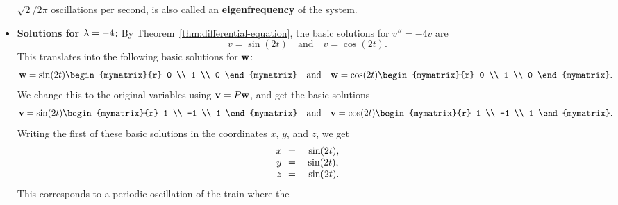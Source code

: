 \begin{solution}
\begin{itemize}
    $\sqrt{2}/2\pi$ oscillations per second, is also called an
    \textbf{eigenfrequency}%
     of the system.
  \item \textbf{Solutions for $\lambda=-4$:}
    By Theorem~\ref{thm:differential-equation}, the basic solutions
    for $v'' = -4v$ are
    \begin{equation*}
      v=\sin(2t)
      \quad\mbox{and}\quad
      v=\cos(2t).
    \end{equation*}
    This translates into the following basic solutions for $\mbox{\bf w}$:
    \begin{equation*}
      \vect{w}
      = \sin(2t)\begin{mymatrix}{r} 0 \\ 1 \\ 0 \end{mymatrix}
      \quad\mbox{and}\quad
      \vect{w}
      = \cos(2t)\begin{mymatrix}{r} 0 \\ 1 \\ 0 \end{mymatrix}.
    \end{equation*}
    We change this to the original variables using $\mbox{\bf v} =
    P\mbox{\bf w}$, and get the basic solutions
    \begin{equation*}
      \vect{v} 
      = \sin(2t)\begin{mymatrix}{r} 1 \\ -1 \\ 1 \end{mymatrix}
      \quad\mbox{and}\quad
      \vect{v}
      = \cos(2t)\begin{mymatrix}{r} 1 \\ -1 \\ 1 \end{mymatrix}.
    \end{equation*}
    Writing the first of these basic solutions in the coordinates $x$,
    $y$, and $z$, we get
    \begin{equation*}
      \begin{array}{c@{~~}c@{~}l}
        x &=& ~~~\sin(2t), \\
        y &=& -\sin(2t), \\
        z &=& ~~~\sin(2t). \\
      \end{array}
    \end{equation*}
    This corresponds to a periodic oscillation of the train where the

\end{itemize}
\end{solution}

